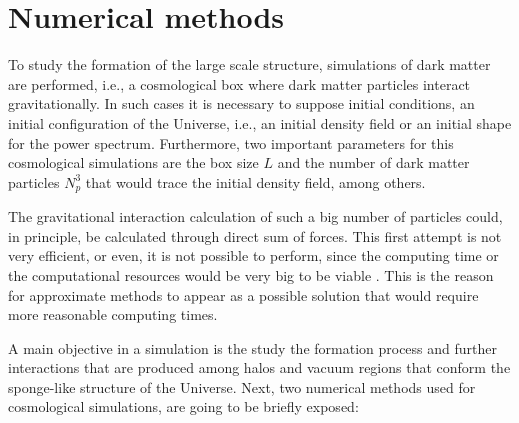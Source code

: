 \section{ Numerical methods }


To study the formation of the large scale structure, simulations of dark matter
are performed, i.e., a cosmological box where dark matter particles interact gravitationally. 
In such cases it is necessary to suppose initial conditions,
an initial configuration of the Universe, i.e., an initial density field
or an initial shape for the power spectrum. 
Furthermore, two important parameters for this cosmological simulations are the box 
size $L$ and the number of dark matter particles $N_p^3$ that would trace the initial
density field, among others. 

The gravitational interaction calculation of such a big number of particles
could, in principle, be calculated through direct sum of forces. This first
attempt is not very efficient, or even, it is not possible to perform,
since the computing time or the computational resources would be very 
big to be viable \cite{tree}. This is the reason for approximate methods 
to appear as a possible solution that would require more reasonable computing times.

A main objective in a simulation is the study the formation process and
further interactions that are produced among halos and vacuum regions that conform
the sponge-like structure of the Universe. Next, two numerical 
methods used for cosmological simulations, are going to be briefly exposed:

